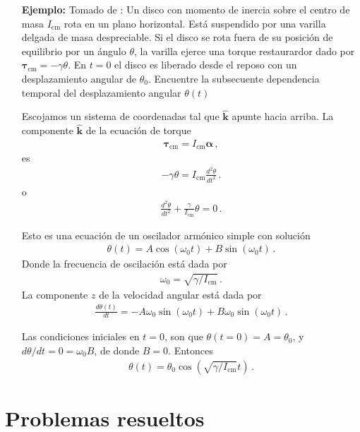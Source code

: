 \begin{itemize}
\item[\textbf{Ejemplo:}] Tomado de \cite{mit2009}: Un disco con momento de inercia sobre el centro de masa $I_{\text{cm}}$ rota en un plano horizontal. Está suspendido por una varilla delgada de masa despreciable. Si el disco se rota fuera de su posición de equilibrio por un ángulo $\theta$, la varilla ejerce una torque restaurardor dado por $\boldsymbol{\tau}_{\text{cm}}=-\gamma \theta$. En $t=0$ el disco es liberado desde el reposo con un desplazamiento angular de $\theta_0$. Encuentre la subsecuente dependencia temporal del desplazamiento angular $\theta(t)$


Escojamos un sistema de coordenadas tal que $\hat{\mathbf{k}}$ apunte hacia arriba.  La componente $\hat{\mathbf{k}}$ de la ecuación de torque
\begin{align}
  \boldsymbol{\tau}_{\text{cm}}=I_{\text{cm}}\boldsymbol{\alpha}\,,
\end{align}
es
\begin{align}
  -\gamma \theta= I_{\text{cm}}\frac{d^2\theta}{d t^2}\,.
\end{align}
o
\begin{align}
\frac{d^2\theta}{d t^2}+\frac{\gamma}{I_{\text{cm}}}\theta=0\,.
\end{align}

Esto es una ecuación de un oscilador armónico simple con solución
\begin{align}
  \theta(t)=A\cos(\omega_0 t)+B\sin(\omega_0 t)\,.
\end{align}
Donde la frecuencia de oscilación está dada por
\begin{align}
  \omega_0=\sqrt{\gamma/I_{\text{cm}}}\,.
\end{align}
La componente $z$ de la velocidad angular está dada por
\begin{align}
  \frac{d\theta(t)}{dt}=-A\omega_0\sin(\omega_0 t)+B\omega_0\sin(\omega_0 t)\,.
\end{align}

Las condiciones iniciales en $t=0$, son que $\theta(t=0)=A=\theta_0$, y $d\theta/dt=0=\omega_0B$, de donde $B=0$. Entonces
\begin{align}
   \theta(t)=\theta_0\cos\left(\sqrt{\gamma/I_{\text{cm}}} t \right)\,.
\end{align}
\end{itemize}

\section{Problemas resueltos}

